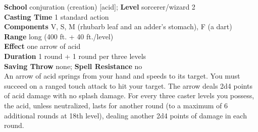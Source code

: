 \textbf{School} conjuration (creation) [acid]; \textbf{Level} sorcerer/wizard 2\\
\textbf{Casting Time} 1 standard action\\
\textbf{Components} V, S, M (rhubarb leaf and an adder's stomach), F (a dart)\\
\textbf{Range} long (400 ft. + 40 ft./level)\\
\textbf{Effect} one arrow of acid\\
\textbf{Duration} 1 round + 1 round per three levels\\
\textbf{Saving Throw} none; \textbf{Spell Resistance} no\\
An arrow of acid springs from your hand and speeds to its target. You must succeed on a ranged touch attack to hit your target. The arrow deals 2d4 points of acid damage with no splash damage. For every three caster levels you possess, the acid, unless neutralized, lasts for another round (to a maximum of 6 additional rounds at 18th level), dealing another 2d4 points of damage in each round.\\
